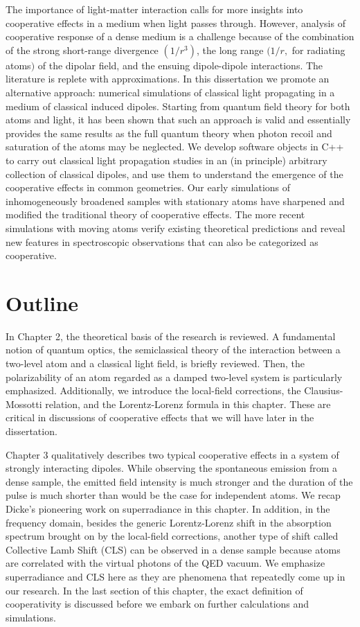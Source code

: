 The importance of light-matter interaction calls for more insights into cooperative effects in a medium when light passes through. However, analysis of cooperative response of a dense medium is a challenge because of the combination of the strong short-range divergence $(1/r^3)$, the long range $(1/r, $ for radiating atoms$)$ of the dipolar field, and the ensuing dipole-dipole interactions. The literature is replete with approximations\cite{FRIEDBERG1973101}. In this dissertation we promote an alternative approach: numerical simulations of classical light propagating in a medium of classical induced dipoles. Starting from quantum field theory for both atoms and light, it has been shown\cite{PhysRevA.55.513} that such an approach is valid and essentially provides the same results as the full quantum theory when photon recoil and saturation of the atoms may be neglected. We develop software objects in C++ to carry out classical light propagation studies in an (in principle) arbitrary collection of classical dipoles, and use them to understand the emergence of the cooperative effects in common geometries. Our early simulations of inhomogeneously broadened samples with stationary atoms have sharpened and modified the traditional theory of cooperative effects. The more recent simulations with moving atoms verify existing theoretical predictions and reveal new features in spectroscopic observations that can also be categorized as cooperative.


\section{Outline}

In Chapter 2, the theoretical basis of the research is reviewed. A fundamental notion of quantum optics, the semiclassical theory of the interaction between a two-level atom and a classical light field, is briefly reviewed. Then, the polarizability of an atom regarded as a damped two-level system is particularly emphasized. Additionally, we introduce the local-field corrections, the Clausius-Mossotti relation, and the Lorentz-Lorenz formula in this chapter. These are critical in discussions of cooperative effects that we will have later in the dissertation.

Chapter 3 qualitatively describes two typical cooperative effects in a system of strongly interacting dipoles. While observing the spontaneous emission from a dense sample, the emitted field intensity is much stronger and the duration of the pulse is much shorter than would be the case for  independent atoms. We recap Dicke's pioneering work on superradiance in this chapter. In addition, in the frequency domain, besides the generic Lorentz-Lorenz shift  in the absorption spectrum brought on by the local-field corrections, another type of shift called Collective Lamb Shift (CLS) can be observed in a dense sample because atoms are correlated with the virtual photons of the QED vacuum. We emphasize superradiance and CLS here as they are phenomena that repeatedly come up in our research. In the last section of this chapter, the exact definition of cooperativity is discussed before we embark on further calculations and simulations.

